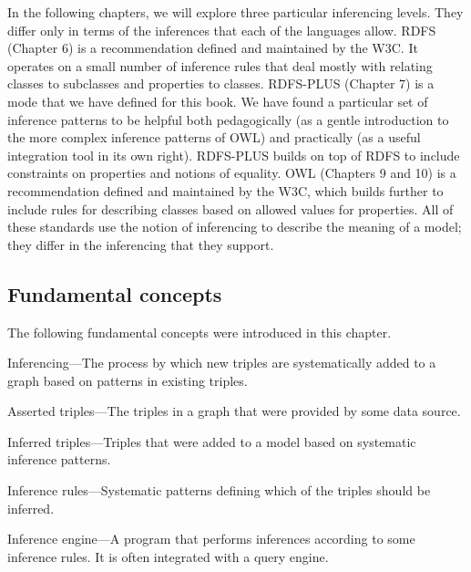 In the following chapters, we will explore three particular inferencing
levels. They differ only in terms of the inferences that each of the
languages allow. RDFS (Chapter 6) is a recommendation defined and
maintained by the W3C. It operates on a small number of inference rules
that deal mostly with relating classes to subclasses and properties to
classes. RDFS-PLUS (Chapter 7) is a mode that we have defined for this
book. We have found a particular set of inference patterns to be helpful
both pedagogically (as a gentle introduction to the more complex
inference patterns of OWL) and practically (as a useful integration tool
in its own right). RDFS-PLUS builds on top of RDFS to include
constraints on properties and notions of equality. OWL (Chapters 9 and
10) is a recommendation defined and maintained by the W3C, which builds
further to include rules for describing classes based on allowed values
for properties. All of these standards use the notion of inferencing to
describe the meaning of a model; they differ in the inferencing that
they support.

\subsection{Fundamental concepts}

The following fundamental concepts were introduced in this chapter.

Inferencing---The process by which new triples are systematically added
to a graph based on patterns in existing triples.

Asserted triples---The triples in a graph that were provided by some
data source.

Inferred triples---Triples that were added to a model based on
systematic inference patterns.

Inference rules---Systematic patterns defining which of the triples
should be inferred.

Inference engine---A program that performs inferences according to some
inference rules. It is often integrated with a query engine.
